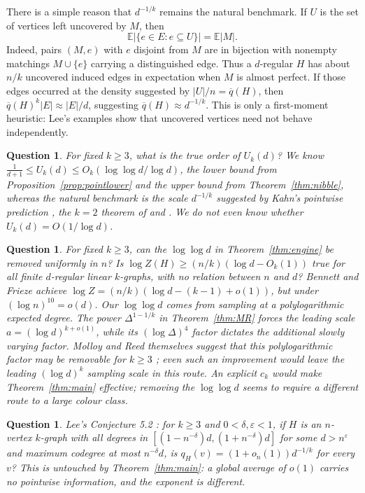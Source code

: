 \documentclass[10pt,a4paper]{amsart}
\newtheorem{question}[theorem]{Question}
\newcommand{\EE}{E}
\newcommand{\EX}{\mathbb{E}}
\newcommand{\qbar}{\overline{q}}
\begin{document}
There is a simple reason that $d^{-1/k}$ remains the natural benchmark. If $U$ is the
set of vertices left uncovered by $M$, then
\[
  \EX\bigl|\{e\in\EE:e\subseteq U\}\bigr|=\EX|M|.
\]
Indeed, pairs $(M,e)$ with $e$ disjoint from $M$ are in bijection with nonempty matchings
$M\cup\{e\}$ carrying a distinguished edge. Thus a $d$-regular $H$ has about $n/k$
uncovered induced edges in expectation when $M$ is almost perfect. If those edges occurred
at the density suggested by $|U|/n=\qbar(H)$, then
$\qbar(H)^k|\EE|\approx |\EE|/d$, suggesting $\qbar(H)\approx d^{-1/k}$. This is only a
first-moment heuristic: Lee's examples show that uncovered vertices need not behave
independently.

\begin{question}
For fixed $k\ge3$, \emph{what is the true order of $U_k(d)$?} We know
$\frac1{d+1}\le U_k(d)\le O_k(\log\log d/\log d)$, the lower bound from
Proposition~\ref{prop:pointlower} and the upper bound from Theorem~\ref{thm:nibble}, whereas the
natural benchmark is the scale $d^{-1/k}$ suggested by Kahn's pointwise prediction
\cite{Kahn95,Kahn97}, the $k=2$ theorem of \cite{KahnKim98} and
\cite[Conjecture 5.2]{Lee}. We do not even know
whether $U_k(d)=O(1/\log d)$.
\end{question}

\begin{question}
For fixed $k\ge3$, \emph{can the $\log\log d$ in Theorem~\ref{thm:engine} be removed
uniformly in $n$?} Is
$\log Z(H)\ge(n/k)(\log d-O_k(1))$ true for all finite $d$-regular linear $k$-graphs, with
no relation between $n$ and $d$? Bennett and Frieze \cite[Theorem 4(b)]{BennettFrieze}
achieve $\log Z=(n/k)(\log d-(k-1)+o(1))$, but under $(\log n)^{10}=o(d)$. Our $\log\log d$
comes from sampling at a polylogarithmic expected degree. The power
$\Delta^{1-1/k}$ in Theorem~\ref{thm:MR} forces the leading scale
$a=(\log d)^{k+o(1)}$, while its $(\log\Delta)^4$ factor dictates the additional
slowly varying factor. Molloy and Reed themselves suggest that this polylogarithmic factor
may be removable for $k\ge3$ \cite{MolloyReed}; even such an improvement would leave the
leading $(\log d)^k$ sampling scale in this route. An explicit $c_k$ would make
Theorem~\ref{thm:main} effective; removing the $\log\log d$ seems to require a different
route to a large colour class.
\end{question}

\begin{question}
\emph{Lee's Conjecture 5.2} \cite[Conjecture 5.2]{Lee}: for $k\ge3$ and
$0<\delta,\varepsilon<1$, if $H$ is an $n$-vertex $k$-graph with all degrees in
$[(1-n^{-\delta})d,(1+n^{-\delta})d]$ for some $d>n^{\varepsilon}$ and maximum codegree at
most $n^{-\delta}d$, is $q_H(v)=(1+o_n(1))d^{-1/k}$ for every $v$? This is untouched by
Theorem~\ref{thm:main}: a global average of $o(1)$ carries no pointwise information, and
the exponent is different.
\end{question}
\end{document}
